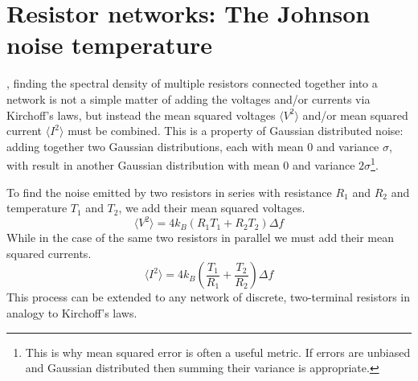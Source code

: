 \section{Resistor networks: The Johnson noise temperature}
\label{section:TJN}
, finding the spectral density of multiple resistors connected together into a network is not a simple matter of adding the voltages and/or currents via Kirchoff's laws, but instead the mean squared voltages $\langle V^2\rangle$ and/or mean squared current $\langle I^2\rangle$ must be combined. This is a property of Gaussian distributed noise: adding together two Gaussian distributions, each with mean $0$ and variance $\sigma$, with result in another Gaussian distribution with mean $0$ and variance $2\sigma$\footnote{This is why mean squared error is often a useful metric. If errors are unbiased and Gaussian distributed then summing their variance is appropriate.}.

To find the noise emitted by two resistors in series with resistance $R_1$ and $R_2$ and temperature $T_1$ and $T_2$, we add their mean squared voltages.
\begin{equation} \label{eq:seriesJN}
\langle V^2\rangle = 4k_B (R_1T_1+R_2T_2)\Delta f
\end{equation}
While in the case of the same two resistors in parallel we must add their mean squared currents.
\begin{equation} \label{eq:parallelJN}
\langle I^2\rangle = 4k_B \left(\frac{T_1}{R_1}+\frac{T_2}{R_2}\right)\Delta f
\end{equation}
This process can be extended to any network of discrete, two-terminal resistors in analogy to Kirchoff's laws.

